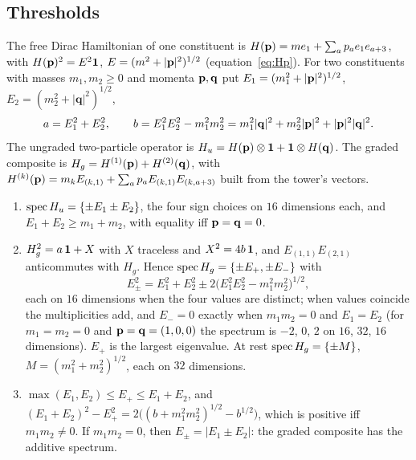 \subsection{Thresholds}
\label{e2:sec:threshold}

The free Dirac Hamiltonian of one constituent is $H(\mathbf p)=me_1+\sum_ap_ae_1e_{a+3}$, with $H(\mathbf p)^2=E^2\mathbf 1$, $E=(m^2+|\mathbf p|^2)^{1/2}$ (equation~\cref{eq:Hp}). For two constituents with masses $m_1,m_2\ge0$ and momenta $\mathbf p,\mathbf q$ put $E_1=(m_1^2+|\mathbf p|^2)^{1/2}$, $E_2=(m_2^2+|\mathbf q|^2)^{1/2}$,
\[
a=E_1^2+E_2^2,\qquad b=E_1^2E_2^2-m_1^2m_2^2=m_1^2|\mathbf q|^2+m_2^2|\mathbf p|^2+|\mathbf p|^2|\mathbf q|^2 .
\]
The ungraded two-particle operator is $H_u=H(\mathbf p)\otimes\mathbf 1+\mathbf 1\otimes H(\mathbf q)$. The graded composite is
$H_g=H^{(1)}(\mathbf p)+H^{(2)}(\mathbf q)$, with $H^{(k)}(\mathbf p)=m_kE_{(k,1)}+\sum_ap_aE_{(k,1)}E_{(k,a+3)}$ built from the tower's vectors.

\begin{proposition}[Thresholds]
\label{e2:prop:threshold}
\begin{enumerate}[label=(\roman*),leftmargin=2.2em]
\item $\operatorname{spec} H_u=\{\pm E_1\pm E_2\}$, the four sign choices on $16$ dimensions each, and $E_1+E_2\ge m_1+m_2$, with equality iff $\mathbf p=\mathbf q=0$.
\item $H_g^2=a\,\mathbf 1+X$ with $X$ traceless and $X^2=4b\,\mathbf 1$, and $E_{(1,1)}E_{(2,1)}$ anticommutes with $H_g$. Hence $\operatorname{spec} H_g=\{\pm E_+,\pm E_-\}$ with
\[
E_\pm^2=E_1^2+E_2^2\pm2\bigl(E_1^2E_2^2-m_1^2m_2^2\bigr)^{1/2},
\]
each on $16$ dimensions when the four values are distinct; when values coincide the multiplicities add, and $E_-=0$ exactly when $m_1m_2=0$
and $E_1=E_2$ (for $m_1=m_2=0$ and $\mathbf p=\mathbf q=(1,0,0)$ the spectrum is $-2$, $0$, $2$ on $16$, $32$, $16$ dimensions). $E_+$ is the largest
eigenvalue. At rest $\operatorname{spec} H_g=\{\pm M\}$, $M=(m_1^2+m_2^2)^{1/2}$, each on $32$
dimensions.
\item $\max(E_1,E_2)\le E_+\le E_1+E_2$, and $(E_1+E_2)^2-E_+^2=2\bigl((b+m_1^2m_2^2)^{1/2}-b^{1/2}\bigr)$, which is positive iff $m_1m_2\neq0$. If
$m_1m_2=0$, then $E_\pm=|E_1\pm E_2|$: the graded composite has the additive spectrum.
\end{enumerate}
\end{proposition}

